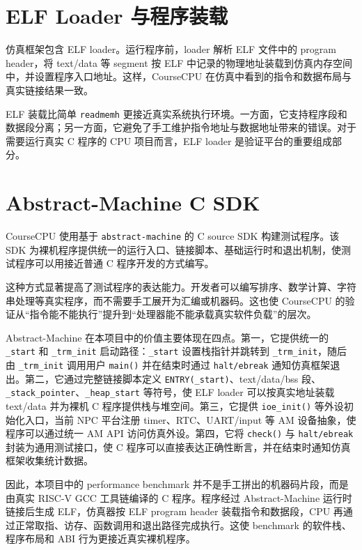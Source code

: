 \documentclass[UTF8,a4paper,12pt]{ctexrep}
\begin{document}
\section{ELF Loader 与程序装载}

仿真框架包含 ELF loader。运行程序前，loader 解析 ELF 文件中的 program header，将 text/data 等 segment 按 ELF 中记录的物理地址装载到仿真内存空间中，并设置程序入口地址。这样，CourseCPU 在仿真中看到的指令和数据布局与真实链接结果一致。

ELF 装载比简单 \texttt{readmemh} 更接近真实系统执行环境。一方面，它支持程序段和数据段分离；另一方面，它避免了手工维护指令地址与数据地址带来的错误。对于需要运行真实 C 程序的 CPU 项目而言，ELF loader 是验证平台的重要组成部分。

\section{Abstract-Machine C SDK}

CourseCPU 使用基于 \texttt{abstract-machine} 的 C source SDK 构建测试程序。该 SDK 为裸机程序提供统一的运行入口、链接脚本、基础运行时和退出机制，使测试程序可以用接近普通 C 程序开发的方式编写。

这种方式显著提高了测试程序的表达能力。开发者可以编写排序、数学计算、字符串处理等真实程序，而不需要手工展开为汇编或机器码。这也使 CourseCPU 的验证从“指令能不能执行”提升到“处理器能不能承载真实软件负载”的层次。

Abstract-Machine 在本项目中的价值主要体现在四点。第一，它提供统一的 \texttt{\_start} 和 \texttt{\_trm\_init} 启动路径：\texttt{\_start} 设置栈指针并跳转到 \texttt{\_trm\_init}，随后由 \texttt{\_trm\_init} 调用用户 \texttt{main()} 并在结束时通过 \texttt{halt/ebreak} 通知仿真框架退出。第二，它通过完整链接脚本定义 \texttt{ENTRY(\_start)}、text/data/bss 段、\texttt{\_stack\_pointer}、\texttt{\_heap\_start} 等符号，使 ELF loader 可以按真实地址装载 text/data 并为裸机 C 程序提供栈与堆空间。第三，它提供 \texttt{ioe\_init()} 等外设初始化入口，当前 NPC 平台注册 timer、RTC、UART/input 等 AM 设备抽象，使程序可以通过统一 AM API 访问仿真外设。第四，它将 \texttt{check()} 与 \texttt{halt/ebreak} 封装为通用测试接口，使 C 程序可以直接表达正确性断言，并在结束时通知仿真框架收集统计数据。

因此，本项目中的 performance benchmark 并不是手工拼出的机器码片段，而是由真实 RISC-V GCC 工具链编译的 C 程序。程序经过 Abstract-Machine 运行时链接后生成 ELF，仿真器按 ELF program header 装载指令和数据段，CPU 再通过正常取指、访存、函数调用和退出路径完成执行。这使 benchmark 的软件栈、程序布局和 ABI 行为更接近真实裸机程序。
\end{document}
